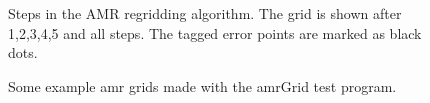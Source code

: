 \begin{figure}[hbt]
  \begin{center}
  \caption{Steps in the AMR regridding algorithm. The grid is shown after 1,2,3,4,5 and all steps.
     The tagged error points are marked as black dots.}
  \end{center} \label{fig:diag}
\end{figure}



\begin{figure}[hbt]
  \begin{center}
  \caption{Some example amr grids made with the amrGrid test program.}
  \end{center} \label{fig:amrExamples}
\end{figure}
